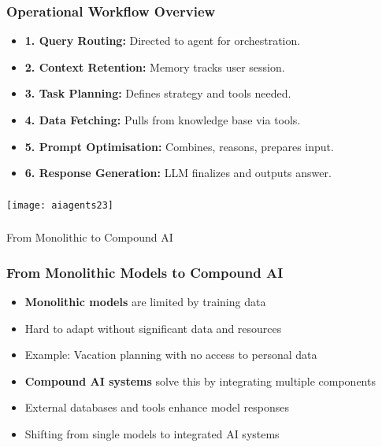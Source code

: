 \begin{frame}[fragile]\frametitle{Operational Workflow Overview}
    \begin{itemize}
        \item \textbf{1. Query Routing:} Directed to agent for orchestration.
        \item \textbf{2. Context Retention:} Memory tracks user session.
        \item \textbf{3. Task Planning:} Defines strategy and tools needed.
        \item \textbf{4. Data Fetching:} Pulls from knowledge base via tools.
        \item \textbf{5. Prompt Optimisation:} Combines, reasons, prepares input.
        \item \textbf{6. Response Generation:} LLM finalizes and outputs answer.
    \end{itemize}
\end{frame}

\begin{frame}[fragile]\frametitle{}

\begin{center}
\texttt{[image: aiagents23]}
\end{center}	  
\end{frame}


\begin{frame}[fragile]\frametitle{}
\begin{center}
{\Large From Monolithic to Compound AI}
\end{center}
\end{frame}

\begin{frame}[fragile]\frametitle{From Monolithic Models to Compound AI}
\begin{itemize}
    \item \textbf{Monolithic models} are limited by training data
    \item Hard to adapt without significant data and resources
    \item Example: Vacation planning with no access to personal data
    \item \textbf{Compound AI systems} solve this by integrating multiple components
    \item External databases and tools enhance model responses
    \item Shifting from single models to integrated AI systems
\end{itemize}
\end{frame}


